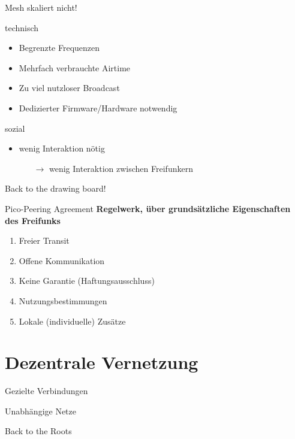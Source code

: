 \documentclass{beamer}
\begin{document}
	\begin{frame}{Mesh skaliert nicht!}
	\begin{block}{technisch}
		\begin{itemize}
			\item Begrenzte Frequenzen
			\item Mehrfach verbrauchte Airtime
			\item Zu viel nutzloser Broadcast
			\item Dedizierter Firmware/Hardware notwendig
		\end{itemize}

	\end{block}
	\begin{block}{sozial}
		\begin{itemize}
			\item wenig Interaktion nötig
			\begin{itemize}
			 \item[$\rightarrow$] wenig Interaktion zwischen Freifunkern
			\end{itemize}

		\end{itemize}
	\end{block}
	\end{frame}

	\begin{frame}[standout]
		Back to the drawing board!
	\end{frame}

	\begin{frame}{Pico-Peering Agreement}
		\textbf{Regelwerk, über grundsätzliche Eigenschaften des Freifunks}

		\begin{enumerate}
			\item Freier Transit
			\item Offene Kommunikation
			\item Keine Garantie (Haftungsausschluss)
			\item Nutzungsbestimmungen
			\item Lokale (individuelle) Zusätze
		\end{enumerate}
	\end{frame}

	\section{Dezentrale Vernetzung}
	\begin{frame}{Gezielte Verbindungen}
	\end{frame}
	\begin{frame}{Unabhängige Netze}
	\end{frame}
	\begin{frame}{Back to the Roots}
	\end{frame}
\end{document}
